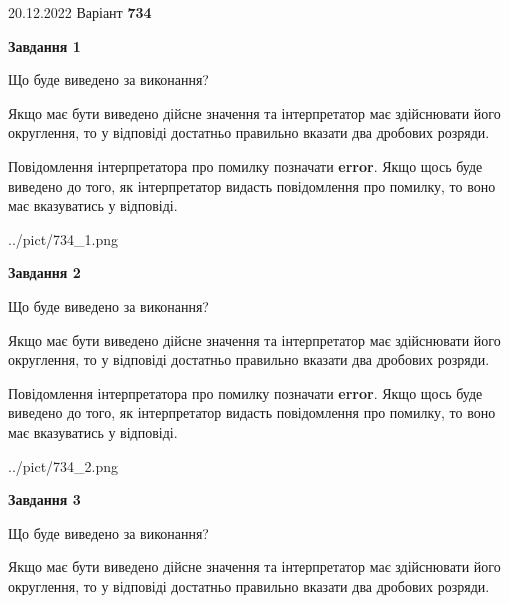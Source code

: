 \documentclass[12pt, ukrainian]{article}
\begin{document}
{20.12.2022 Варіант \No \textbf { 734 }\par}
{
\begin {Large}

{\begin {center}\textbf{Завдання 1}\end {center}}\par
Що буде виведено за виконання? \par

Якщо має бути виведено дійсне значення та інтерпретатор має здійснювати його округлення, 
то у відповіді достатньо правильно вказати два дробових розряди.

Повідомлення інтерпретатора про помилку позначати \textbf{error}.
Якщо щось буде виведено до того, як інтерпретатор видасть повідомлення про помилку, 
то воно має вказуватись у відповіді. \par

\begin{center}
	{../pict/734_1.png}
\end{center}
\newpage

{\begin {center}\textbf{Завдання 2}\end {center}}\par
Що буде виведено за виконання? \par

Якщо має бути виведено дійсне значення та інтерпретатор має здійснювати його округлення, 
то у відповіді достатньо правильно вказати два дробових розряди.

Повідомлення інтерпретатора про помилку позначати \textbf{error}.
Якщо щось буде виведено до того, як інтерпретатор видасть повідомлення про помилку, 
то воно має вказуватись у відповіді. \par

\begin{center}
	{../pict/734_2.png}
\end{center}
\newpage

{\begin {center}\textbf{Завдання 3}\end {center}}\par
Що буде виведено за виконання? \par

Якщо має бути виведено дійсне значення та інтерпретатор має здійснювати його округлення, 
то у відповіді достатньо правильно вказати два дробових розряди.


\end{Large}}
\end{document}
